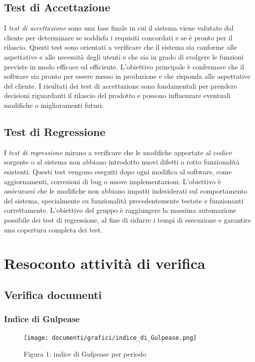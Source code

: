 \documentclass{article}
\begin{document}
{\subsection{Test di Accettazione}
I \textit{test di accettazione} sono una fase finale in cui il sistema viene valutato dal cliente per determinare se soddisfa i requisiti concordati e se è pronto per il rilascio. Questi test sono orientati a verificare che il sistema sia conforme alle aspettative e alle necessità degli utenti e che sia in grado di svolgere le funzioni previste in modo efficace ed efficiente. L'obiettivo principale è confermare che il software sia pronto per essere messo in produzione e che risponda alle aspettative del cliente. I risultati dei test di accettazione sono fondamentali per prendere decisioni riguardanti il rilascio del prodotto e possono influenzare eventuali modifiche o miglioramenti futuri.

\subsection{Test di Regressione}
I \textit{test di regressione} mirano a verificare che le modifiche apportate al codice sorgente o al sistema non abbiano introdotto nuovi difetti o rotto funzionalità esistenti. Questi test vengono eseguiti dopo ogni modifica al software, come aggiornamenti, correzioni di bug o nuove implementazioni. L'obiettivo è assicurarsi che le modifiche non abbiano impatti indesiderati sul comportamento del sistema, specialmente su funzionalità precedentemente testate e funzionanti correttamente. L'obiettivo del gruppo è raggiungere la massima automazione possibile dei test di regressione, al fine di ridurre i tempi di esecuzione e garantire una copertura completa dei test.


\section{Resoconto attività di verifica}
\subsection{Verifica documenti}
\subsubsection{Indice di Gulpease}

    \begin{figure}[H]
    \centering
    \texttt{[image: documenti/grafici/indice\_di\_Gulpease.png]}
     \caption{Figura 1: indice di Gulpease per periodo}
    \end{figure}

}
\end{document}
